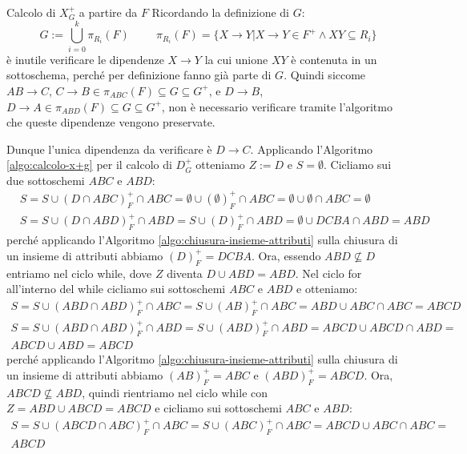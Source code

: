 \begin{enumerate}
\begin{Example}{Calcolo di $X^+_G$ a partire da $F$}{}
        Ricordando la definizione di $G$:
        \begin{equation*}
            G:=\bigcup^k_{i=0}\pi_{R_i}(F)\hspace{1cm}\pi_{R_i}(F)=\{X\to Y|X\to Y\in F^+\land XY\subseteq R_i\}
        \end{equation*}
        è inutile verificare le dipendenze $X\to Y$ la cui unione $XY$ è contenuta in un sottoschema, perché per definizione fanno già parte di $G$. Quindi siccome $AB\to C$, $C\to B\in \pi_{ABC}(F)\subseteq G\subseteq G^+$, e $D\to B$, $D\to A\in \pi_{ABD}(F)\subseteq G\subseteq G^+$, non è necessario verificare tramite l'algoritmo che queste dipendenze vengono preservate.

        Dunque l'unica dipendenza da verificare è $D\to C$. Applicando l'Algoritmo \ref{algo:calcolo-x+g} per il calcolo di $D^+_G$ otteniamo $Z:=D$ e $S=\emptyset$. Cicliamo sui due sottoschemi $ABC$ e $ABD$:
        \begin{align*}
            &S=S\cup(D\cap ABC)^+_F\cap ABC=\emptyset\cup(\emptyset)^+_F\cap ABC=\emptyset\cup\emptyset\cap ABC=\emptyset\\
            &S=S\cup (D\cap ABD)^+_F\cap ABD=S\cup (D)^+_F\cap ABD= \emptyset\cup DCBA\cap ABD=ABD
        \end{align*}
        perché applicando l'Algoritmo \ref{algo:chiusura-insieme-attributi} sulla chiusura di un insieme di attributi abbiamo $(D)^+_F=DCBA$. Ora, essendo $ABD\not\subseteq D$ entriamo nel ciclo while, dove $Z$ diventa $D\cup ABD=ABD$. Nel ciclo for all'interno del while cicliamo sui sottoschemi $ABC$ e $ABD$ e otteniamo:
        \begin{align*}
            S=S\cup(ABD\cap ABD)^+_F\cap ABC=S\cup (AB)^+_F\cap ABC=ABD\cup ABC\cap ABC=ABCD
        \end{align*}\vspace{-0.7cm}
        \begin{align*}
            S=S\cup (ABD\cap ABD)^+_F\cap ABD=S\cup (ABD)^+_F\cap ABD=ABCD\cup ABCD\cap ABD=\\ABCD\cup ABD=ABCD
        \end{align*}
        perché applicando l'Algoritmo \ref{algo:chiusura-insieme-attributi} sulla chiusura di un insieme di attributi abbiamo $(AB)^+_F=ABC$ e $(ABD)^+_F=ABCD$. Ora, $ABCD\not\subseteq ABD$, quindi rientriamo nel ciclo while con $Z=ABD\cup ABCD=ABCD$ e cicliamo sui sottoschemi $ABC$ e $ABD$:
        \begin{align*}
            S=S\cup (ABCD\cap ABC)^+_F\cap ABC=S\cup (ABC)^+_F\cap ABC=ABCD\cup ABC\cap ABC=\\ABCD

\end{align*}
\end{Example}
\end{enumerate}
